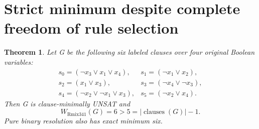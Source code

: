 \documentclass[11pt]{article}
\newtheorem{theorem}{Theorem}
\begin{document}
\section{Strict minimum despite complete freedom of rule selection}
\begin{theorem}
Let G be the following six labeled clauses over four original Boolean variables:
\[
\begin{array}{ll}
s_0=(\neg x_3\vee x_1\vee x_4),&s_1=(\neg x_1\vee x_2),\\
s_2=(x_1\vee x_3),&s_3=(\neg x_4\vee\neg x_3),\\
s_4=(\neg x_2\vee\neg x_1\vee x_3),&s_5=(\neg x_2\vee x_4).
\end{array}
\]
Then G is clause-minimally UNSAT and
\[
\boxed{W_{\mathrm{Rmix341}}(G)=6>5=|\operatorname{clauses}(G)|-1}.
\]
Pure binary resolution also has exact minimum six.
\end{theorem}
\end{document}
